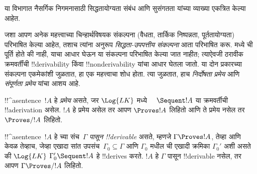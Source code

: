 \documentclass[../../../include/open-logic-section]{subfiles}
\begin{document}
\begin{editorial}
  या विभागात नैसर्गिक निगमनासाठी सिद्धतायोग्यता संबंध आणि सुसंगतता यांच्या
  व्याख्या एकत्रित केल्या आहेत.
\end{editorial}

      {}
      {}


\begin{explain}
जशा आपण अनेक महत्त्वाच्या चिन्हार्थविषयक संकल्पना (वैधता, तार्किक निष्पन्नता,
पूर्ततायोग्यता) परिभाषित केल्या आहेत, तशाच त्यांना अनुरूप
\emph{सिद्धता-उपपत्तीय संकल्पना} आता परिभाषित करू. मध्ये
ची पूर्ति होते की नाही, याचा आधार घेऊन या संकल्पना परिभाषित
केल्या जात नाहीत; त्याऐवजी ठरावीक क्रमवर्तींची !!{derivability} किंवा
!!{nonderivability} यांचा आधार घेतला जातो. या दोन प्रकारच्या संकल्पना
एकमेकांशी जुळतात, हा एक महत्त्वाचा शोध होता. त्या जुळतात, हाच
\emph{निर्दोषता प्रमेय} आणि \emph{संपूर्णता प्रमेय} यांचा आशय आहे.
\end{explain}

\begin{defn}[प्रमेये]
!!^a{sentence}~$!A$ हे \emph{प्रमेय} असते, जर $\Log{LK}$ मध्ये
$\quad \Sequent !A$ या क्रमवर्तीची !!a{derivation} असेल. $!A$ हे प्रमेय
असेल तर आपण $\Proves !A$ लिहितो आणि ते प्रमेय नसेल तर $\Proves/ !A$ लिहितो.
\end{defn}

\begin{defn}[!!^{derivability}]
!!^a{sentence}~$!A$ हे च्या संच~$\Gamma$ \emph{पासून
!!{derivable}} असते, म्हणजे $\Gamma \Proves !A$, तेव्हा आणि केवळ तेव्हाच,
जेव्हा एखादा सांत उपसंच~$\Gamma_0 \subseteq \Gamma$ आणि $\Gamma_0$ मधील
ची एखादी क्रमिका $\Gamma_0'$ अशी असते की $\Log{LK}$
$\Gamma_0' \Sequent !A$ हे !!{derive}s करते. $!A$ हे $\Gamma$ पासून
!!{derivable} नसेल, तर आपण $\Gamma \Proves/ !A$ लिहितो.
\end{defn}
\end{document}
